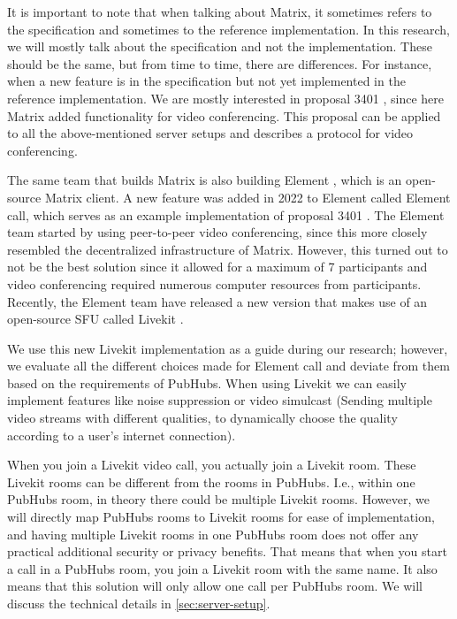 \documentclass{report}
\begin{document}
It is important to note that when talking about Matrix, it sometimes refers to the specification and sometimes to the
reference implementation. In this research, we will mostly talk about the specification and not the implementation. These
should be the same, but from time to time, there are differences. For instance, when a new feature is in the specification
but not yet implemented in the reference implementation. We are mostly interested in proposal 3401 \cite{
noauthor_matrix-spec-proposalsproposals3401-group-voipmd_nodate}, since here Matrix added functionality for video conferencing. This proposal
can be applied to all the above-mentioned server setups and describes a protocol for video conferencing.

The same team that builds Matrix is also building Element \cite{noauthor_element_nodate}, which is an open-source Matrix client.
A new feature was added in 2022 \cite{noauthor_introducing_2022} to Element called Element call, which serves as an
example implementation of proposal 3401 \cite{noauthor_matrix-spec-proposalsproposals3401-group-voipmd_nodate}.
The Element team started by using peer-to-peer video conferencing, since this more closely resembled the decentralized
infrastructure of Matrix. However, this turned out to not be the best solution since it allowed for a maximum of 7
participants and video conferencing required numerous computer resources from participants. Recently, the Element team
have released a new version that makes use of an open-source SFU called Livekit \cite{noauthor_livekit_nodate}.

We use this new Livekit implementation as a guide during our research; however, we evaluate all the different
choices made for Element call and deviate from them based on the requirements of PubHubs. When using Livekit we can
easily implement features like noise suppression or video simulcast (Sending multiple video streams with different
qualities, to dynamically choose the quality according to a user's internet connection).

When you join a Livekit video call, you actually join a Livekit room. These Livekit rooms can be different from the
rooms in PubHubs. I.e., within one PubHubs room, in theory there could be multiple Livekit rooms. However, we will
directly map PubHubs rooms to Livekit rooms for ease of implementation, and having multiple Livekit rooms in one
PubHubs room does not offer any practical additional security or privacy benefits. That means that when you start a
call in a PubHubs room, you join a Livekit room with the same name. It also means that this solution will only allow
one call per PubHubs room. We will discuss the technical details in \autoref{sec:server-setup}.
\end{document}
